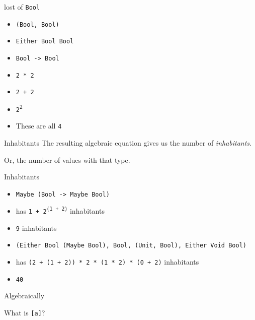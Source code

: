 \begin{frame}
\begin{block}{lost of \lstinline{Bool}}
\begin{itemize}
  \item<1-> \lstinline{(Bool, Bool)}
  \item<1-> \lstinline{Either Bool Bool}
  \item<1-> \lstinline{Bool -> Bool}
  \item<2-> \lstinline{2 * 2}
  \item<2-> \lstinline{2 + 2}
  \item<2-> \lstinline{2}\textsuperscript{\lstinline{2}}
  \item<3-> These are all \lstinline{4}
\end{itemize}
\end{block}
\end{frame}

\begin{frame}
\begin{block}{Inhabitants}
The resulting algebraic equation gives us the number of \emph{inhabitants}.

Or, the number of values with that type.
\end{block}
\end{frame}

\begin{frame}
\begin{block}{Inhabitants}
\begin{itemize}
  \item<1-> \lstinline{Maybe (Bool -> Maybe Bool)}
  \item<1-> has \lstinline{1 + 2}\textsuperscript{\lstinline{(1 + 2)}} inhabitants
  \item<1-> \lstinline{9} inhabitants
  \item<2-> \scriptsize{\lstinline{(Either Bool (Maybe Bool), Bool, (Unit, Bool), Either Void Bool)}}
  \item<2-> has \lstinline{(2 + (1 + 2)) * 2 * (1 * 2) * (0 + 2)} inhabitants
  \item<2-> \lstinline{40}
\end{itemize}
\end{block}
\end{frame}

\begin{frame}
\begin{block}{Algebraically}
\begin{center}
What is \lstinline{[a]}?
\end{center}
\end{block}
\end{frame}

